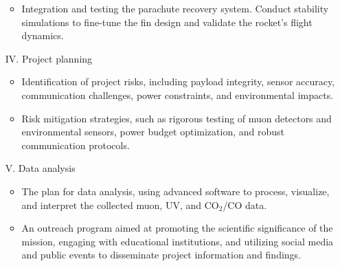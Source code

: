 \begin{itemize}[leftmargin=1cm, itemindent=0.25cm, noitemsep, topsep=0pt, label=$\bullet$]
\begin{itemize}[label=$\bullet$, noitemsep, topsep=2pt]
\item Integration and testing the parachute recovery system. Conduct stability simulations to fine-tune the fin design and validate the rocket's flight dynamics.
\end{itemize}
\item[IV.] Project planning
\begin{itemize}[label=$\bullet$, noitemsep, topsep=2pt]
\item Identification of project risks, including payload integrity, sensor accuracy, communication challenges, power constraints, and environmental impacts.
\item Risk mitigation strategies, such as rigorous testing of muon detectors and environmental sensors, power budget optimization, and robust communication protocols.
\end{itemize}
\item[V.] Data analysis
\begin{itemize}[label=$\bullet$, noitemsep, topsep=2pt]
\item The plan for data analysis, using advanced software to process, visualize, and interpret the collected muon, UV, and CO$_2$/CO data.
\item An outreach program aimed at promoting the scientific significance of the mission, engaging with educational institutions, and utilizing social media and public events to disseminate project information and findings.
\end{itemize}
\end{itemize}

